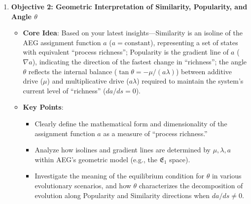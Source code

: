 \documentclass[12pt]{article}
\begin{document}
\begin{enumerate}
    \item \textbf{Objective 2: Geometric Interpretation of Similarity, Popularity, and Angle $\theta$}
    \begin{itemize}
        \item \textbf{Core Idea}: Based on your latest insights---Similarity is an isoline of the AEG assignment function $a$ ($a=\text{constant}$), representing a set of states with equivalent ``process richness''; Popularity is the gradient line of $a$ ($\nabla a$), indicating the direction of the fastest change in ``richness''; the angle $\theta$ reflects the internal balance ($\tan\theta = -\mu/(a\lambda)$) between additive drive ($\mu$) and multiplicative drive ($a\lambda$) required to maintain the system's current level of ``richness'' ($da/ds=0$).
        \item \textbf{Key Points}:
        \begin{itemize}
            \item Clearly define the mathematical form and dimensionality of the assignment function $a$ as a measure of ``process richness.''
            \item Analyze how isolines and gradient lines are determined by $\mu, \lambda, a$ within AEG's geometric model (e.g., the $\mathfrak{E}_1$ space).
            \item Investigate the meaning of the equilibrium condition for $\theta$ in various evolutionary scenarios, and how $\theta$ characterizes the decomposition of evolution along Popularity and Similarity directions when $da/ds \neq 0$.
        \end{itemize}
    \end{itemize}


\end{enumerate}
\end{document}
